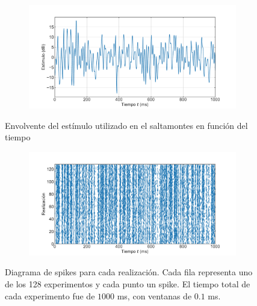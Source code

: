 \documentclass[11pt,twocolumn,twoside]{opticajnl}
\begin{document}
\begin{figure}[ht]
    \centering
         \begin{subfigure}[b]{\linewidth}
            \includegraphics[width=\textwidth]{Figuras/estimulo_vs_t.pdf}
         \end{subfigure}
    \caption{Envolvente del estímulo utilizado en el saltamontes en función del tiempo} 
    \label{fig:señal}
\end{figure}
\begin{figure}[ht]
    \centering
         \begin{subfigure}[b]{\linewidth}
            \includegraphics[width=\textwidth]{Figuras/reailzaciones_vs_t.pdf}
         \end{subfigure}
    \caption{Diagrama de spikes para cada realización. Cada fila representa uno de los 128 experimentos y cada punto un spike. El tiempo total de cada experimento fue de $1000$ ms, con ventanas de $0.1$ ms.} 
    \label{fig:realizaciones}
\end{figure}
\end{document}
